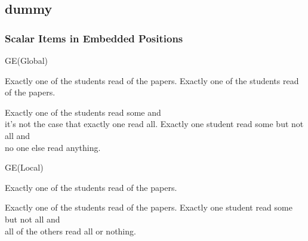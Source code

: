 \documentclass[fleqn,10pt,xcolor=dvipsnames]{beamer}
\newcommand{\GE}{GE\xspace}
\begin{document}
\subsection{dummy}


\begin{frame}[shrink=2]
  \frametitle{Scalar Items in Embedded Positions}
  \begin{block}{\GE \hfill (Global)}
    \begin{exe}
       Exactly one of the students read {\color{mycol}{some}} of the
      papers.
    \ex Exactly one of the students read {\color{mycol}{all}} of the papers.
    \ex
      \begin{xlist}
      \ex Exactly one of the students read some and  \\
        it's not the case that exactly one read all.
      \ex Exactly one student read some but not all and  \\
        no one else read anything.
      \end{xlist}
    \end{exe}
  \end{block}
  \begin{block}{\GE \hfill (Local)}
    \begin{exe}
       Exactly one of the students read {\color{mycol}{some}} of the
      papers.
    \ex
      \begin{xlist}
      \ex Exactly one of the students read {\color{mycol}{some but not all}} of the papers.
      \ex Exactly one student read some but not all and  \\
        all of the others read all or nothing.
      \end{xlist}
    \end{exe}
  \end{block}
\end{frame}
\end{document}
